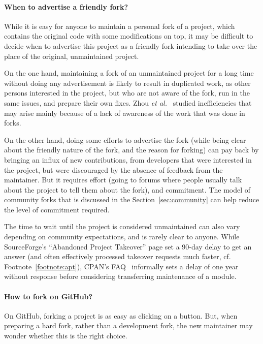 \paragraph{When to advertise a friendly fork?}

While it is easy for anyone to maintain a personal fork of a project, which contains the original code with some modifications on top, it may be difficult to decide when to advertise this project as a friendly fork intending to take over the place of the original, unmaintained project.

On the one hand, maintaining a fork of an unmaintained project for a long time without doing any advertisement is likely to result in duplicated work, as other persons interested in the project, but who are not aware of the fork, run in the same issues, and prepare their own fixes.
Zhou \emph{et al.}~\cite{zhou2019fork} studied inefficiencies that may arise mainly because of a lack of awareness of the work that was done in forks.

On the other hand, doing some efforts to advertise the fork (while being clear about the friendly nature of the fork, and the reason for forking) can pay back by bringing an influx of new contributions, from developers that were interested in the project, but were discouraged by the absence of feedback from the maintainer.
But it requires effort (going to forums where people usually talk about the project to tell them about the fork), and commitment.
The model of community forks that is discussed in the Section~\ref{sec:community} can help reduce the level of commitment required.

The time to wait until the project is considered unmaintained can also vary depending on community expectations, and is rarely clear to anyone.
While SourceForge's ``Abandoned Project Takeover'' page set a 90-day delay to get an answer (and often effectively processed takeover requests much faster, cf. Footnote~\ref{footnote:apt}), CPAN's FAQ~\cite{cpan_faq} informally sets a delay of one year without response before considering transferring maintenance of a module.%

\paragraph{How to fork on GitHub?}

On GitHub, forking a project is as easy as clicking on a button.
But, when preparing a hard fork, rather than a development fork, the new maintainer may wonder whether this is the right choice.

